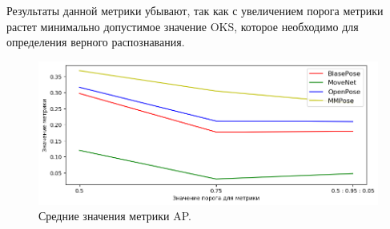 Результаты данной метрики убывают, так как с увеличением порога метрики растет минимально допустимое значение OKS, которое необходимо для определения верного распознавания.

\begin{figure}[h]
	\centering
   \includegraphics[width=\textwidth]{./images/results/AP}
   \caption{Средние значения метрики AP.}
   \label{fig:results_ap}
\end{figure}


\newpage
